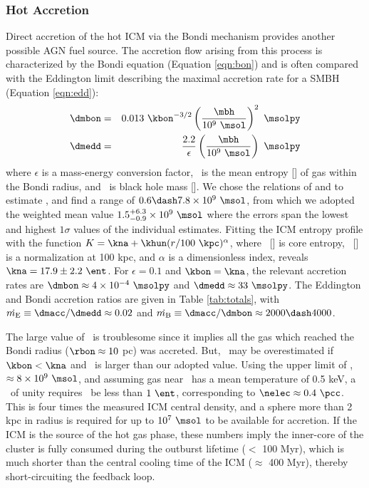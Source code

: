 \documentclass[iop]{emulateapj-rtx4}
\begin{document}
\subsubsection{Hot Accretion}

Direct accretion of the hot ICM via the Bondi mechanism provides
another possible AGN fuel source. The accretion flow arising from this
process is characterized by the Bondi equation (Equation
\ref{eqn:bon}) and is often compared with the Eddington limit
describing the maximal accretion rate for a SMBH (Equation
\ref{eqn:edd}):
\begin{eqnarray}
  \dmbon &=& 0.013 ~\kbon^{-3/2} \left(\frac{\mbh}{10^9
    ~\msol}\right)^{2} ~\msolpy \label{eqn:bon}\\
  \dmedd &=& \frac{2.2}{\epsilon} \left(\frac{\mbh}{10^9~\msol}\right)
  ~\msolpy  \label{eqn:edd}
\end{eqnarray}
where $\epsilon$ is a mass-energy conversion factor, \kbon\ is the
mean entropy [\ent] of gas within the Bondi radius, and \mbh\ is black
hole mass [\msol]. We chose the relations of
\citet{2002ApJ...574..740T} and \citet{2007MNRAS.379..711G} to
estimate \mbh, and find a range of $0.6 \dash 7.8 \times 10^9 ~\msol$,
from which we adopted the weighted mean value $1.5^{+6.3}_{-0.9}
\times 10^9 ~\msol$ where the errors span the lowest and highest
$1\sigma$ values of the individual estimates. Fitting the ICM entropy
profile with the function $K = \kna +\khun (r/100 ~\kpc)^{\alpha}$,
where \kna\ [\ent] is core entropy, \khun\ [\ent] is a normalization
at 100 kpc, and $\alpha$ is a dimensionless index, reveals $\kna =
17.9 \pm 2.2 ~\ent$. For $\epsilon = 0.1$ and $\kbon = \kna$, the
relevant accretion rates are $\dmbon \approx 4 \times 10^{-4}
~\msolpy$ and $\dmedd \approx 33 ~\msolpy$. The Eddington and Bondi
accretion ratios are given in Table \ref{tab:totals}, with $\dme
\equiv \dmacc/\dmedd \approx 0.02$ and $\dmb \equiv \dmacc/\dmbon
\approx 2000 \dash 4000$.

The large value of \dmb\ is troublesome since it implies all the gas
which reached the Bondi radius ($\rbon \approx 10$ pc) was
accreted. But, \dmb\ may be overestimated if $\kbon < \kna$ and
\mbh\ is larger than our adopted value. Using the upper limit of \mbh,
$\approx 8 \times 10^9 ~\msol$, and assuming gas near \rbon\ has a
mean temperature of 0.5 keV, a \dmb\ of unity requires \kbon\ be less
than $1 ~\ent$, corresponding to $\nelec \approx 0.4 ~\pcc$. This is
four times the measured ICM central density, and a sphere more than 2
kpc in radius is required for up to $10^7 ~\msol$ to be available for
accretion. If the ICM is the source of the hot gas phase, these
numbers imply the inner-core of the cluster is fully consumed during
the outburst lifetime ($<$ 100 Myr), which is much shorter than the
central cooling time of the ICM ($\approx$ 400 Myr), thereby
short-circuiting the feedback loop.
\end{document}

